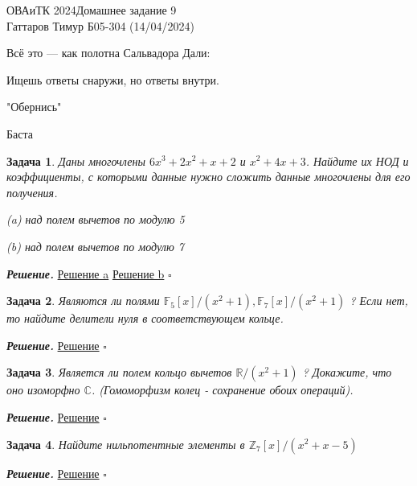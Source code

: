 \documentclass[12pt]{article}
\newtheorem{problem}{Задача}
\newenvironment{solution}[1][\it{Реше\textit{}ние}]{\textbf{#1. } }{$\square$}
\begin{document}
\noindent ОВАиТК 2024\hfill Домашнее задание 9 \\
Гаттаров Тимур Б05-304 (14/04/2024)

\hrulefill


\epigraph{Всё это — как полотна Сальвадора Дали:

Ищешь ответы снаружи, но ответы внутри.}{"Обернись"


Баста}

\begin{problem}
 Даны многочлены $6 x^3+2 x^2+x+2$ и $x^2+4 x+3$. Найдите их НОД и коэффициенты, с которыми данные нужно сложить данные многочлены для его получения.

 
(a) над полем вычетов по модулю 5


(b) над полем вычетов по модулю 7
\end{problem}

\begin{solution}
\href{https://imgbly.com/ib/cu9DA7tHFE}{Решение a}
\href{https://imgbly.com/ib/NrkHrM7Bxy}{Решение b}
\end{solution}


\begin{problem}
     Являются ли полями $\mathbb{F}_5[x] /\left(x^2+1\right), \mathbb{F}_7[x] /\left(x^2+1\right)$ ? Если нет, то найдите делители нуля в соответствующем кольце.
\end{problem}

\begin{solution}
    \href{https://imgbly.com/ib/uXPWMuOqMh}{Решение}
\end{solution}

\begin{problem}
     Является ли полем кольцо вычетов $\mathbb{R} /\left(x^2+1\right)$ ? Докажите, что оно изоморфно $\mathbb{C}$. (Гомоморфизм колец - сохранение обоих операций).
\end{problem}


\begin{solution}
    \href{https://imgbly.com/ib/bGJd5D8noI}{Решение}
\end{solution}


\begin{problem}
     Найдите нильпотентные элементы в $\mathbb{Z}_7[x] /\left(x^2+x-5\right)$
\end{problem}


    
\begin{solution}
    \href{https://imgbly.com/ib/IFFKiaT9OH}{Решение}
\end{solution}
\end{document}
